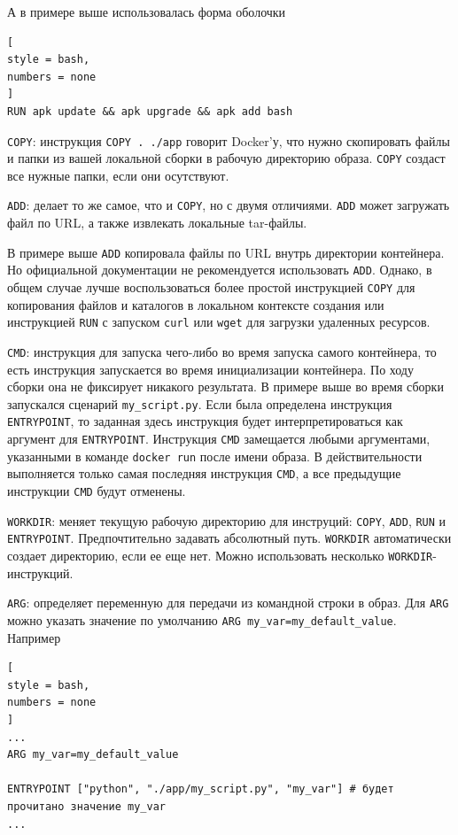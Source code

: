 \documentclass[%
	11pt,
	a4paper,
	utf8,
		]{article}
\begin{document}
А в примере выше использовалась форма оболочки 
\begin{lstlisting}[
style = bash,
numbers = none	
]
RUN apk update && apk upgrade && apk add bash
\end{lstlisting}

\texttt{COPY}: инструкция \verb|COPY . ./app| говорит Docker'у, что нужно скопировать файлы и папки из вашей локальной сборки в рабочую директорию образа. \texttt{COPY} создаст все нужные папки, если они осутствуют.

\texttt{ADD}: делает то же самое, что и \texttt{COPY}, но с двумя отличиями. \texttt{ADD} может загружать файл по URL, а также извлекать локальные tar-файлы.

В примере выше \texttt{ADD} копировала файлы по URL внутрь директории контейнера. Но официальной документации не рекомендуется использовать \texttt{ADD}. Однако, в общем случае лучше воспользоваться более простой инструкцией \texttt{COPY} для копирования файлов и каталогов в локальном контексте создания или инструкцией \texttt{RUN} с запуском \texttt{curl} или \texttt{wget} для загрузки удаленных ресурсов.

\texttt{CMD}: инструкция для запуска чего-либо во время запуска самого контейнера, то есть инструкция запускается во время инициализации контейнера. По ходу сборки она не фиксирует никакого результата. В примере выше во время сборки запускался сценарий \verb|my_script.py|. Если была определена инструкция \texttt{ENTRYPOINT}, то заданная здесь инструкция будет интерпретироваться как аргумент для \texttt{ENTRYPOINT}. Инструкция \texttt{CMD} замещается любыми аргументами, указанными в команде \texttt{docker run} после имени образа. В действительности выполняется только самая последняя инструкция \texttt{CMD}, а все предыдущие инструкции \texttt{CMD} будут отменены.

\texttt{WORKDIR}: меняет текущую рабочую директорию для инструций: \texttt{COPY}, \texttt{ADD}, \texttt{RUN} и \texttt{ENTRYPOINT}. Предпочтительно задавать абсолютный путь. \texttt{WORKDIR} автоматически создает директорию, если ее еще нет. Можно использовать несколько \texttt{WORKDIR}-инструкций.

\texttt{ARG}: определяет переменную для передачи из командной строки в образ. Для \texttt{ARG} можно указать значение по умолчанию \texttt{ARG my\_var=my\_default\_value}. Например
\begin{lstlisting}[
style = bash,
numbers = none	
]
...
ARG my_var=my_default_value

ENTRYPOINT ["python", "./app/my_script.py", "my_var"] # будет прочитано значение my_var
...
\end{lstlisting}
\end{document}
